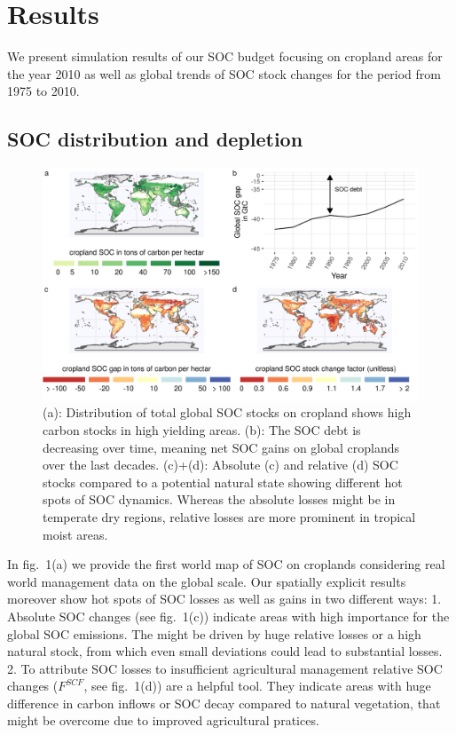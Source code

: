 \documentclass[gc, manuscript]{copernicus}
\begin{document}
\section{Results}

We present simulation results of our SOC budget focusing on cropland
areas for the year 2010 as well as global trends of SOC stock changes
for the period from 1975 to 2010.

\subsection{SOC distribution and depletion}

\begin{figure}[H]
\includegraphics[width=18cm]{../ResultNotebooks/Output/Images/4panelfigure} \caption{(a): Distribution of total global SOC stocks on cropland shows high carbon stocks in high yielding areas. (b): The SOC debt is decreasing over time, meaning net SOC gains on global croplands over the last decades. (c)+(d): Absolute (c) and relative (d) SOC stocks compared to a potential natural state showing different hot spots of SOC dynamics. Whereas the absolute losses might be in temperate dry regions, relative losses are more prominent in tropical moist areas.}\label{fig:SOCmaps}
\end{figure}

In fig.~1(a) we provide the first world map of SOC on croplands
considering real world management data on the global scale. Our
spatially explicit results moreover show hot spots of SOC losses as well
as gains in two different ways: 1. Absolute SOC changes (see fig.~1(c))
indicate areas with high importance for the global SOC emissions. The
might be driven by huge relative losses or a high natural stock, from
which even small deviations could lead to substantial losses. 2. To
attribute SOC losses to insufficient agricultural management relative
SOC changes (\(F^{SCF}\), see fig.~1(d)) are a helpful tool. They
indicate areas with huge difference in carbon inflows or SOC decay
compared to natural vegetation, that might be overcome due to improved
agricultural pratices.
\end{document}
